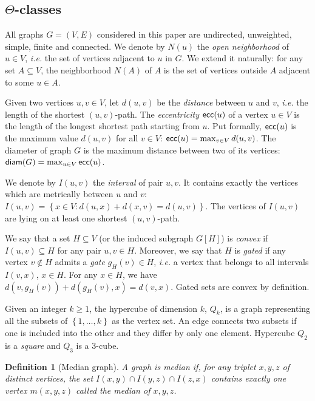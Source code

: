 \documentclass{article}
\newtheorem{definition}{Definition}
\newcommand{\set}[1]{\left\{ #1 \right\}}
\newcommand{\diam}{\mbox{\textsf{diam}}}
\newcommand{\ecc}{\mbox{\textsf{ecc}}}
\begin{document}
\subsection{$\Theta$-classes} 

All graphs $G = (V,E)$ considered in this paper are undirected, unweighted, simple, finite and connected. We denote by $N(u)$ the \textit{open neighborhood} of $u \in V$, {\em i.e.} the set of vertices adjacent to $u$ in $G$. We extend it naturally: for any set $A \subseteq V$, the neighborhood $N(A)$ of $A$ is the set of vertices outside $A$ adjacent to some $u \in A$.

Given two vertices $u,v \in V$, let $d(u,v)$ be the \textit{distance} between $u$ and $v$, {\em i.e.} the length of the shortest $(u,v)$-path. The \textit{eccentricity} $\ecc(u)$ of a vertex $u \in V$ is the length of the longest shortest path starting from $u$. Put formally, $\ecc(u)$ is the maximum value $d(u,v)$ for all $v \in V$: $\ecc(u) = \max_{v \in V} d(u,v)$. The diameter of graph $G$ is the maximum distance between two of its vertices: $\diam(G) = \max_{u \in V} \ecc(u)$. 

We denote by $I(u,v)$ the \textit{interval} of pair $u,v$. It contains exactly the vertices which are metrically between $u$ and $v$:
$I(u,v) = \set{x \in V: d(u,x) + d(x,v) = d(u,v)}$. The vertices of $I(u,v)$ are lying on at least one shortest $(u,v)$-path.

We say that a set $H\subseteq V$ (or the induced subgraph $G\left[H\right]$) is \textit{convex} if $I(u,v) \subseteq H$ for any pair $u,v \in H$. Moreover, we say that $H$ is \textit{gated} if any vertex $v \notin H$ admits a \textit{gate} $g_H(v) \in H$, {\em i.e.} a vertex that belongs to all intervals $I(v,x)$, $x\in H$. For any $x \in H$, we have $d(v,g_H(v)) + d(g_H(v),x) = d(v,x)$. Gated sets are convex by definition.

Given an integer $k \ge 1$, the hypercube of dimension $k$, $Q_k$, is a graph representing all the subsets of $\set{1,\ldots,k}$ as the vertex set. An edge connects two subsets if one is included into the other and they differ by only one element. Hypercube $Q_2$ is a \textit{square} and $Q_3$ is a $3$-cube.

\begin{definition}[Median graph]
A graph is \textit{median} if, for any triplet $x,y,z$ of distinct vertices, the set $I(x,y) \cap I(y,z) \cap I(z,x)$ contains exactly one vertex $m(x,y,z)$ called the median of $x,y,z$.
\label{def:median}
\end{definition}
\end{document}
